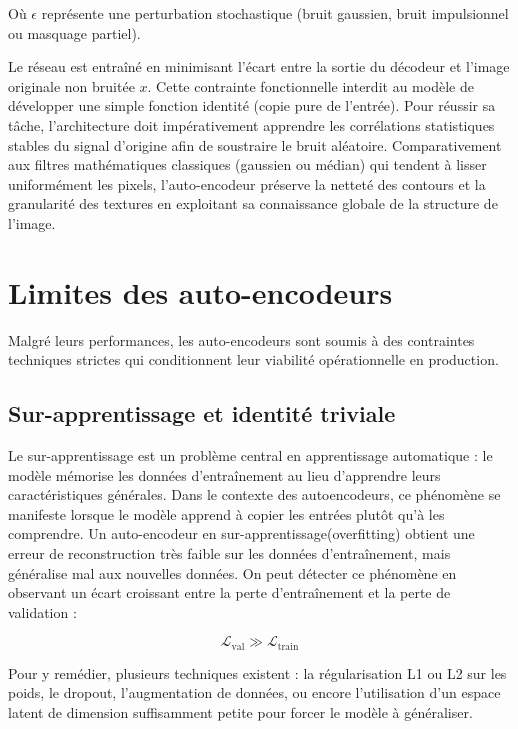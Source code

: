 \documentclass[11pt,a4paper]{report}
\begin{document}
Où $\epsilon$ représente une perturbation stochastique (bruit gaussien, bruit impulsionnel ou masquage partiel). 

Le réseau est entraîné en minimisant l'écart entre la sortie du décodeur et l'image originale non bruitée $x$. Cette contrainte fonctionnelle interdit au modèle de développer une simple fonction identité (copie pure de l'entrée). Pour réussir sa tâche, l'architecture doit impérativement apprendre les corrélations statistiques stables du signal d'origine afin de soustraire le bruit aléatoire. Comparativement aux filtres mathématiques classiques (gaussien ou médian) qui tendent à lisser uniformément les pixels, l'auto-encodeur préserve la netteté des contours et la granularité des textures en exploitant sa connaissance globale de la structure de l'image.

\section{Limites des auto-encodeurs}
\label{sec:limites_ae}

Malgré leurs performances, les auto-encodeurs sont soumis à des contraintes techniques strictes qui conditionnent leur viabilité opérationnelle en production.

\subsection{Sur-apprentissage et identité triviale}

Le sur-apprentissage est un problème central en apprentissage automatique : le modèle mémorise les données d’entraînement au lieu d’apprendre leurs caractéristiques générales. Dans le contexte des autoencodeurs, ce phénomène se manifeste lorsque le modèle apprend à copier les entrées plutôt qu’à les comprendre. 
Un auto-encodeur en sur-apprentissage(overfitting) obtient une erreur de reconstruction très faible sur les données d’entraînement, mais généralise mal aux nouvelles données. On peut détecter ce phénomène en observant un écart croissant entre la perte d’entraînement et la perte de validation : 

\begin{equation}
    \mathcal{L}_{\text{val}} \gg \mathcal{L}_{\text{train}}
\end{equation}

Pour y remédier, plusieurs techniques existent : la régularisation L1 ou L2 sur les poids, le dropout, l’augmentation de données, ou encore l’utilisation d’un espace latent de dimension suffisamment petite pour forcer le modèle à généraliser.  
\end{document}
